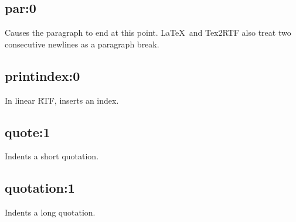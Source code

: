 \subsection*{par:0}\label{par}

Causes the paragraph to end at this point. \LaTeX\ and Tex2RTF also
treat two consecutive newlines as a paragraph break.

\subsection*{printindex:0}\label{printindex}

In linear RTF, inserts an index.

\subsection*{quote:1}\label{quote}

Indents a short quotation.

\subsection*{quotation:1}\label{quotation}

Indents a long quotation.


